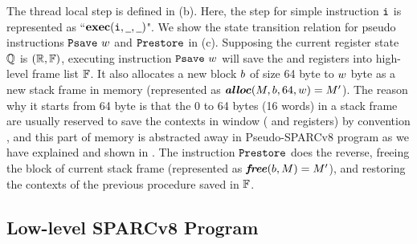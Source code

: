 The thread local step is defined in  
\Fig{\ref{fig:selected-opsem-high-level-prog}} (b). 
Here, the step for simple instruction $\texttt{i}{}$ is 
represented as ``$\textbf{exec}({\texttt{i}{}}, {\underline{\ \,}}, {\underline{\ \,}})$". 
We show the state transition relation for pseudo instructions 
$\texttt{Psave} \ w$ and $\texttt{Prestore}$ in 
\Fig{\ref{fig:selected-opsem-high-level-prog}} (c). 
Supposing the current register state $\mathbb{Q}$ is 
$(\mathbb{R}, \mathbb{F})$, executing instruction
$\texttt{Psave} \ w$ will save the \localRN{} and \inRN{} registers 
into high-level frame list $\mathbb{F}$. It also allocates 
a new block $b$ of size 64 byte to $w$ byte  
as a new stack frame in memory 
(represented as $\textbf{\textit{alloc}}(M, b, 64, w) = M'$). 
The reason why it starts from 64 byte is that the 0 to 64 bytes 
(16 words) in a stack frame are usually reserved to save 
the contexts in window (\localRN{} and \inRN{} registers)
by convention \cite{sparc},   
and this part of memory is abstracted away in 
Pseudo-SPARCv8 program as we have explained and shown in 
\Fig{\ref{fig:Abstraction of Register Windows and Memory}}.
The instruction $\texttt{Prestore}$ does the reverse, 
freeing the block of current stack frame
(represented as $\textbf{\textit{free}}(b, M) = M'$), and 
restoring the contexts of the previous procedure saved in $\mathbb{F}$. 

\subsection{Low-level SPARCv8 Program}
\label{subsec:low-level SPARCv8 Program}


